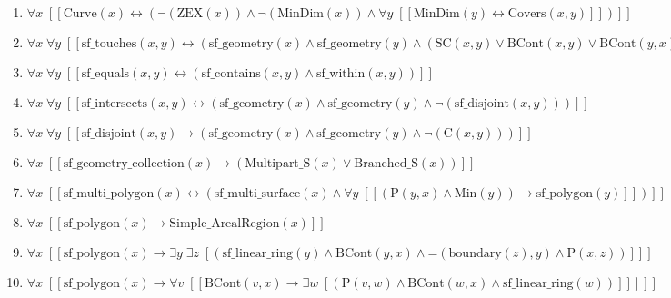 \documentclass{article}
\begin{document}
\begin{enumerate}
\item $\forall x\;  \left[ \left[ \textrm{Curve}(x) \leftrightarrow \left(\neg \left(\textrm{ZEX}(x)\right) \land \neg \left(\textrm{MinDim}(x)\right) \land \forall y\;  \left[ \left[ \textrm{MinDim}(y) \leftrightarrow \textrm{Covers}(x,y) \right] \right]\right) \right] \right]$
\item $\forall x\; \forall y\;  \left[ \left[ \textrm{sf\_touches}(x,y) \leftrightarrow \left(\textrm{sf\_geometry}(x) \land \textrm{sf\_geometry}(y) \land \left(\textrm{SC}(x,y) \lor \textrm{BCont}(x,y) \lor \textrm{BCont}(y,x)\right)\right) \right] \right]$
\item $\forall x\; \forall y\;  \left[ \left[ \textrm{sf\_equals}(x,y) \leftrightarrow \left(\textrm{sf\_contains}(x,y) \land \textrm{sf\_within}(x,y)\right) \right] \right]$
\item $\forall x\; \forall y\;  \left[ \left[ \textrm{sf\_intersects}(x,y) \leftrightarrow \left(\textrm{sf\_geometry}(x) \land \textrm{sf\_geometry}(y) \land \neg \left(\textrm{sf\_disjoint}(x,y)\right)\right) \right] \right]$
\item $\forall x\; \forall y\;  \left[ \left[ \textrm{sf\_disjoint}(x,y) \rightarrow \left(\textrm{sf\_geometry}(x) \land \textrm{sf\_geometry}(y) \land \neg \left(\textrm{C}(x,y)\right)\right) \right] \right]$
\item $\forall x\;  \left[ \left[ \textrm{sf\_geometry\_collection}(x) \rightarrow \left(\textrm{Multipart\_S}(x) \lor \textrm{Branched\_S}(x)\right) \right] \right]$
\item $\forall x\;  \left[ \left[ \textrm{sf\_multi\_polygon}(x) \leftrightarrow \left(\textrm{sf\_multi\_surface}(x) \land \forall y\;  \left[ \left[ \left(\textrm{P}(y,x) \land \textrm{Min}(y)\right) \rightarrow \textrm{sf\_polygon}(y) \right] \right]\right) \right] \right]$
\item $\forall x\;  \left[ \left[ \textrm{sf\_polygon}(x) \rightarrow \textrm{Simple\_ArealRegion}(x) \right] \right]$
\item $\forall x\;  \left[ \left[ \textrm{sf\_polygon}(x) \rightarrow \exists y\; \exists z\;  \left[ \left(\textrm{sf\_linear\_ring}(y) \land \textrm{BCont}(y,x) \land \textrm{=}(\textrm{boundary}(z),y) \land \textrm{P}(x,z)\right) \right] \right] \right]$
\item $\forall x\;  \left[ \left[ \textrm{sf\_polygon}(x) \rightarrow \forall v\;  \left[ \left[ \textrm{BCont}(v,x) \rightarrow \exists w\;  \left[ \left(\textrm{P}(v,w) \land \textrm{BCont}(w,x) \land \textrm{sf\_linear\_ring}(w)\right) \right] \right] \right] \right] \right]$

\end{enumerate}
\end{document}

